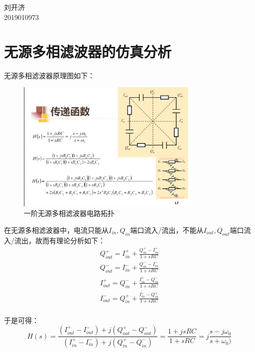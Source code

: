 \documentclass[12pt, a4paper]{article}
\begin{document}
	\begin{center}
		\vspace{0.2in}
		 \\ [12pt]
		  \\ [12pt]
		{\fontsize{14pt}{1.2em}\selectfont
			刘开济\\ [10pt]
			2019010973 \\ [10pt]
		}
	\end{center}
    \section{无源多相滤波器的仿真分析}
     无源多相滤波器原理图如下：
    \begin{figure}[H]
    	\centering
    	\includegraphics[width = 0.8\textwidth]{theory}
    	\caption{一阶无源多相滤波器电路拓扑}
    \end{figure}\par
    在无源多相滤波器中，电流只能从$I_{in}, Q_{in}$端口流入/流出，不能从$I_{out}, Q_{out}$端口流入/流出，故而有理论分析如下：
    \begin{gather}
    	Q_{out}^{+} = I_{in}^+ + \frac{Q_{in}^+ - I_{in}^+}{1 + sRC}\\
    	Q_{out}^{-} = I_{in}^- + \frac{Q_{in}^- - I_{in}^-}{1 + sRC}\\
    	I_{out}^{+} = Q_{in}^- + \frac{I_{in}^+ - Q_{in}^-}{1 + sRC}\\
    	I_{out}^{-} = Q_{in}^+ + \frac{I_{in}^- - Q_{in}^+}{1 + sRC}\\
    \end{gather}\par
    于是可得：
    \begin{equation}
    	H(s) = \frac{(I_{out}^+ - I_{out}^- ) + j(Q_{out}^+ - Q_{out}^-)}{(I_{in}^+ - I_{in}^- ) + j(Q_{in}^+ - Q_{in}^-)} = \frac{1 + jsRC}{1 + sRC} = j \frac{s - j\omega_0}{s + \omega_0)}
    \end{equation}\par
\end{document}
